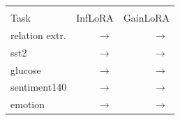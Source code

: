 {\footnotesize\setlength{\tabcolsep}{2pt}\begin{tabular}{lrr}
    \toprule
    &  \\
    \cmidrule(l){2-3}
    Task & InfLoRA & GainLoRA \\
    \midrule
    relation extr. & \AudFullInfloraPtLearnedRelation{}\,$\to$\,\AudFullInfloraPtFinalRelation{} & \AudFullGainloraPtLearnedRelation{}\,$\to$\,\AudFullGainloraPtFinalRelation{} \\
    sst2 & \AudFullInfloraPtLearnedSst{}\,$\to$\,\AudFullInfloraPtFinalSst{} & \AudFullGainloraPtLearnedSst{}\,$\to$\,\AudFullGainloraPtFinalSst{} \\
    glucose & \AudFullInfloraPtLearnedGlucose{}\,$\to$\,\AudFullInfloraPtFinalGlucose{} & \AudFullGainloraPtLearnedGlucose{}\,$\to$\,\AudFullGainloraPtFinalGlucose{} \\
    sentiment140 & \AudFullInfloraPtLearnedSentiment{}\,$\to$\,\AudFullInfloraPtFinalSentiment{} & \AudFullGainloraPtLearnedSentiment{}\,$\to$\,\AudFullGainloraPtFinalSentiment{} \\
    emotion & \AudFullInfloraPtLearnedEmotion{}\,$\to$\,\AudFullInfloraPtFinalEmotion{} & \AudFullGainloraPtLearnedEmotion{}\,$\to$\,\AudFullGainloraPtFinalEmotion{} \\
    \bottomrule
\end{tabular}}
